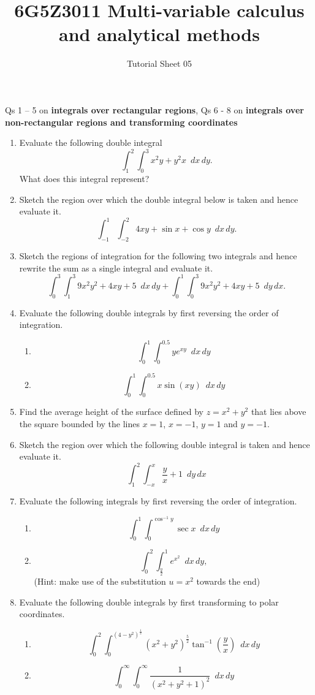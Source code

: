 \documentclass[20pt, a4paper]{extarticle}
\date{}
\begin{document}
\title{6G5Z3011 Multi-variable calculus and analytical methods}
\author{Tutorial Sheet 05}
\maketitle

Qs 1 -- 5 on \textbf{integrals over rectangular regions}, Qs 6 - 8 on \textbf{integrals over non-rectangular regions and transforming coordinates}
\begin{enumerate}
    \item
Evaluate the following double integral
$$\int_1^2  \int_0^3 x^2y + y^2 x \, \,\,  dx \, dy .$$
What does this integral represent?
\item
Sketch the region over which the double integral below is taken and hence evaluate it.
$$\int_{-1}^1 \int_{-2}^2 4xy + \sin x + \cos y \,\,\,  dx \, dy.$$
\item
Sketch the regions of integration for the following two integrals and hence rewrite the sum as a single integral and evaluate it.
$$ \int_0^3 \int_1^3 9x^2 y^2 + 4xy + 5 \, \, \, dx \, dy +
\int_0^1 \int_0^3 9x^2 y^2 + 4xy + 5 \, \, \, dy \, dx .$$
\item
Evaluate the following double integrals by first reversing the order of integration.
\begin{enumerate}
\item
$$ \int_0^1 \int_0^{0.5} y e^{xy} \, \, \, dx \, dy $$
\item
$$\int_0^1 \int_0^{0.5} x \sin(xy) \, \, \, dx \, dy $$
\end{enumerate}
\item
Find the average height of the surface defined by $z=x^2 + y^2$ that lies above the square bounded by the lines $x=1$, $x=-1$, $y=1$ and $y=-1$.


\item
Sketch the region over which the following double integral is taken and hence evaluate it.
$$ \int_1^2 \int_{-x}^x \frac{y}{x} + 1 \, \, \, dy \, dx $$
\item
Evaluate the following integrals by first reversing the order of integration.
\begin{enumerate}
\item
$$\int_0^1 \int_0^{\cos^{-1} y} \sec x \, \, \, dx \, dy $$
\item
$$ \int_0^2 \int_{\frac{y}{2}}^1 e^{x^2} \, \, \, dx \, dy,$$
(Hint: make use of the substitution $u=x^2$ towards the end)
\end{enumerate}
\newpage
\item
Evaluate the following double integrals by first transforming to polar coordinates.
\begin{enumerate}
\item
$$\int_0^2 \int_0^{\left ( 4 - y^2 \right )^{\frac{1}{2}}} \left ( x^2 + y^2 \right )^{\frac{5}{2}} \tan^{-1} \left ( \frac{y}{x} \right ) \, \, \, dx \, dy $$

\item
$$\int_0^\infty \int_0^\infty \frac{1}{\left ( x^2 + y^2 + 1 \right )^2} \, \, \, dx \, dy $$
\end{enumerate}
    \end{enumerate}
\end{document}
